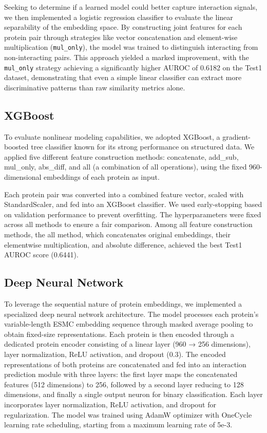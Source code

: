 \documentclass{article}
\begin{document}
Seeking to determine if a learned model could better capture interaction signals, we then implemented a logistic regression classifier to evaluate the linear separability of the embedding space. By constructing joint features for each protein pair through strategies like vector concatenation and element-wise multiplication (\texttt{mul\_only}), the model was trained to distinguish interacting from non-interacting pairs. This approach yielded a marked improvement, with the \texttt{mul\_only} strategy achieving a significantly higher AUROC of 0.6182 on the Test1 dataset, demonstrating that even a simple linear classifier can extract more discriminative patterns than raw similarity metrics alone.	

\subsection{XGBoost}
To evaluate nonlinear modeling capabilities, we adopted XGBoost, a gradient-boosted tree classifier known for its strong performance on structured data. We applied five different feature construction methods: concatenate, add\_sub, mul\_only, abs\_diff, and all (a combination of all operations), using the fixed 960-dimensional embeddings of each protein as input.

Each protein pair was converted into a combined feature vector, scaled with StandardScaler, and fed into an XGBoost classifier. We used early-stopping based on validation performance to prevent overfitting. The hyperparameters were fixed across all methods to ensure a fair comparison.
Among all feature construction methods, the all method, which concatenates original embeddings, their elementwise multiplication, and absolute difference, achieved the best Test1 AUROC score (0.6441).

\subsection{Deep Neural Network}

To leverage the sequential nature of protein embeddings, we implemented a specialized deep neural network architecture. The model processes each protein's variable-length ESMC embedding sequence through masked average pooling to obtain fixed-size representations. Each protein is then encoded through a dedicated protein encoder consisting of a linear layer (960 → 256 dimensions), layer normalization, ReLU activation, and dropout (0.3). The encoded representations of both proteins are concatenated and fed into an interaction prediction module with three layers: the first layer maps the concatenated features (512 dimensions) to 256, followed by a second layer reducing to 128 dimensions, and finally a single output neuron for binary classification. Each layer incorporates layer normalization, ReLU activation, and dropout for regularization. The model was trained using AdamW optimizer with OneCycle learning rate scheduling, starting from a maximum learning rate of 5e-3.
\end{document}
